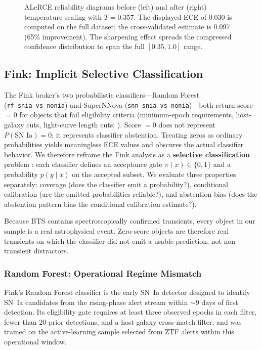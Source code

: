 \documentclass[twocolumn]{aastex631}
\begin{document}
\begin{figure}
\caption{ALeRCE reliability diagrams before (left) and after (right) temperature scaling with $T = 0.357$. The displayed ECE of 0.030 is computed on the full dataset; the cross-validated estimate is 0.097 (65\% improvement). The sharpening effect spreads the compressed confidence distribution to span the full $[0.35, 1.0]$ range. \label{fig:alerce_tempscaling}}
\end{figure}


\subsection{Fink: Implicit Selective Classification} \label{sec:fink}

The Fink broker's two probabilistic classifiers---Random Forest (\texttt{rf\_snia\_vs\_nonia}) and SuperNNova (\texttt{snn\_snia\_vs\_nonia})---both return score $= 0$ for objects that fail eligibility criteria (minimum-epoch requirements, host-galaxy cuts, light-curve length cuts; \citealt{leoni2022, moller2020}). Score $= 0$ does not represent $P(\text{SN~Ia}) = 0$; it represents classifier abstention. Treating zeros as ordinary probabilities yields meaningless ECE values and obscures the actual classifier behavior. We therefore reframe the Fink analysis as a \textbf{selective classification} problem \citep{geifman2017}: each classifier defines an acceptance gate $\pi(x) \in \{0, 1\}$ and a probability $p(y \mid x)$ on the accepted subset. We evaluate three properties separately: coverage (does the classifier emit a probability?), conditional calibration (are the emitted probabilities reliable?), and abstention bias (does the abstention pattern bias the conditional calibration estimate?).

Because BTS contains spectroscopically confirmed transients, every object in our sample is a real astrophysical event. Zero-score objects are therefore real transients on which the classifier did not emit a usable prediction, not non-transient distractors.

\subsubsection{Random Forest: Operational Regime Mismatch} \label{sec:fink_rf}

Fink's Random Forest classifier \citep{leoni2022} is the early SN~Ia detector designed to identify SN~Ia candidates from the rising-phase alert stream within $\sim$9 days of first detection. Its eligibility gate requires at least three observed epochs in each filter, fewer than 20 prior detections, and a host-galaxy cross-match filter, and was trained on the active-learning sample selected from ZTF alerts within this operational window.
\end{document}
